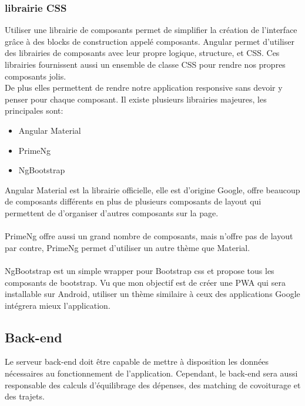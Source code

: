 \subsubsection{librairie CSS}
Utiliser une librairie de composants permet de simplifier la création de l'interface grâce à des blocks de construction appelé composants\@.
Angular permet d'utiliser des librairies de composants avec leur propre logique, structure, et CSS\@.
Ces librairies fournissent aussi un ensemble de classe CSS pour rendre nos propres composants jolis.\\
De plus elles permettent de rendre notre application responsive sans devoir y penser pour chaque composant.
Il existe plusieurs librairies majeures, les principales sont:
\begin{itemize}
    \item Angular Material
    \item PrimeNg
    \item NgBootstrap
\end{itemize}
Angular Material est la librairie officielle, elle est d'origine Google,
offre beaucoup de composants différents en plus de plusieurs composants de layout qui permettent de d'organiser d'autres composants sur la page.\\\\

PrimeNg offre aussi un grand nombre de composants, mais n'offre pas de layout par contre,
PrimeNg permet d'utiliser un autre thème que Material.\\\\
NgBootstrap est un simple wrapper pour Bootstrap css et propose tous les composants de bootstrap.
Vu que mon objectif est de créer une PWA qui sera installable sur Android,
utiliser un thème similaire à ceux des applications Google intégrera mieux l'application.
\newpage

\subsection{Back-end}\label{subsec:back-end}
Le serveur back-end doit être capable de mettre à disposition les données nécessaires au fonctionnement de l'application.
Cependant, le back-end sera aussi responsable des calculs d'équilibrage des dépenses, des matching de covoiturage et des trajets.\\\\

